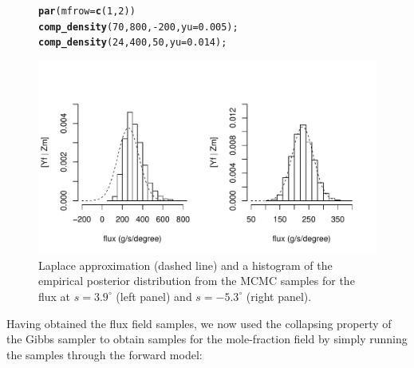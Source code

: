 \documentclass[a4paper,11pt]{article}\usepackage[]{graphicx}\usepackage[]{color}
\makeatletter
\def\maxwidth{ %
  \ifdim\Gin@nat@width>\linewidth
    \linewidth
  \else
    \Gin@nat@width
  \fi
}
\newcommand{\hlnum}[1]{\textcolor[rgb]{0.686,0.059,0.569}{#1}}%
\newcommand{\hlopt}[1]{\textcolor[rgb]{0,0,0}{#1}}%
\newcommand{\hlstd}[1]{\textcolor[rgb]{0.345,0.345,0.345}{#1}}%
\newcommand{\hlkwc}[1]{\textcolor[rgb]{0.333,0.667,0.333}{#1}}%
\newcommand{\hlkwd}[1]{\textcolor[rgb]{0.737,0.353,0.396}{\textbf{#1}}}%
\newenvironment{kframe}{%
 \def\at@end@of@kframe{}%
 \ifinner\ifhmode%
  \def\at@end@of@kframe{\end{minipage}}%
  \begin{minipage}{\columnwidth}%
 \fi\fi%
 \def\FrameCommand##1{\hskip\@totalleftmargin \hskip-\fboxsep
 \colorbox{shadecolor}{##1}\hskip-\fboxsep
     \hskip-\linewidth \hskip-\@totalleftmargin \hskip\columnwidth}%
 \MakeFramed {\advance\hsize-\width
   \@totalleftmargin\z@ \linewidth\hsize
   \@setminipage}}%
 {\par\unskip\endMakeFramed%
 \at@end@of@kframe}
\newenvironment{knitrout}{}{} %
\makeatother
\begin{document}
\begin{figure}[!ht]
\begin{center}
\begin{knitrout}
\color{fgcolor}\begin{kframe}
\begin{alltt}
\hlkwd{par}\hlstd{(}\hlkwc{mfrow}\hlstd{=}\hlkwd{c}\hlstd{(}\hlnum{1}\hlstd{,}\hlnum{2}\hlstd{))}
\hlkwd{comp_density}\hlstd{(}\hlnum{70}\hlstd{,}\hlnum{800}\hlstd{,}\hlopt{-}\hlnum{200}\hlstd{,}\hlkwc{yu}\hlstd{=}\hlnum{0.005}\hlstd{);}
\hlkwd{comp_density}\hlstd{(}\hlnum{24}\hlstd{,}\hlnum{400}\hlstd{,}\hlnum{50}\hlstd{,}\hlkwc{yu}\hlstd{=}\hlnum{0.014}\hlstd{);}
\end{alltt}
\end{kframe}
\includegraphics[width=\maxwidth]{figure/unnamed-chunk-7-1} 

\end{knitrout}
\caption{Laplace approximation (dashed line) and a histogram of the empirical posterior distribution from the MCMC samples for the flux at $s = 3.9^\circ$ (left panel) and $s = -5.3^\circ$ (right panel).} \label{fig:Lap_vs_mcmc}
\end{center}
\end{figure}

Having obtained the flux field samples, we now used the collapsing property of the Gibbs sampler to obtain samples for the mole-fraction field by simply running the samples through the forward model:
\end{document}
